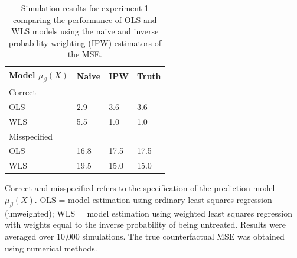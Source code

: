 \begin{table}[t]
    \centering
    \caption{Simulation results for experiment 1 comparing the performance of OLS and WLS models using the naive and inverse probability weighting (IPW) estimators of the MSE.}
    \begin{threeparttable}
        \begin{tabular}{p{3cm}R{1.25cm}R{1.25cm}R{1.25cm}}
        \toprule
        Model $\mu_{\beta}(X)$ & Naive & IPW & Truth  \\
        \midrule
        Correct & & & \\
        \hspace{1em}OLS & 2.9 & 3.6 & 3.6\\
        \hspace{1em}WLS & 5.5 & 1.0 & 1.0\\
        \addlinespace[0.25em]
        Misspecified & & & \\
        \hspace{1em}OLS & 16.8 & 17.5 & 17.5\\
        \hspace{1em}WLS & 19.5 & 15.0 & 15.0\\
        \bottomrule
        \end{tabular}
        \begin{tablenotes}
        \item \noindent Correct and misspecified refers to the specification of the  prediction model $\mu_\beta(X)$. OLS = model estimation using ordinary least squares regression (unweighted); WLS = model estimation using weighted least squares regression with weights equal to the inverse probability of being untreated. Results were averaged over 10,000 simulations. The true counterfactual MSE was obtained using numerical methods. 
        \end{tablenotes}
        \end{threeparttable}
    
\end{table}

